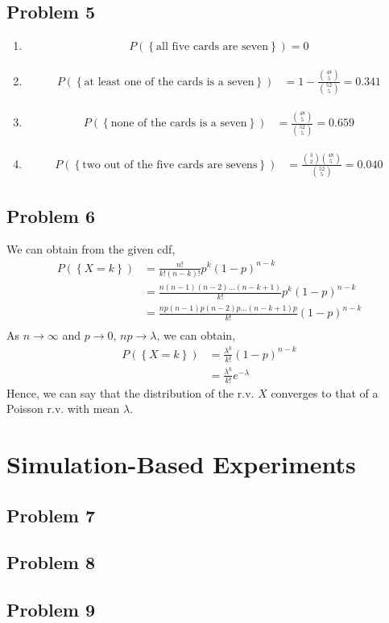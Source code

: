 \documentclass{article}
\begin{document}
	\subsection*{Problem 5}
		\begin{enumerate}
			\item
				\begin{align*}
					P\left(\left\{ \text{all five cards are seven} \right\}\right) = 0
				\end{align*}
			\item
				\begin{align*}
					P\left(\left\{ \text{at least one of the cards is a seven} \right\}\right) &= 1 - \frac{\binom{48}{5}}{\binom{52}{5}} = 0.341
				\end{align*}
			\item
				\begin{align*}
					P\left(\left\{ \text{none of the cards is a seven} \right\}\right) &= \frac{\binom{48}{5}}{\binom{52}{5}} = 0.659
				\end{align*}
			\item
				\begin{align*}
					P\left(\left\{ \text{two out of the five cards are sevens} \right\}\right) &= \frac{\binom{3}{2}\binom{48}{5}}{\binom{52}{5}} = 0.040
				\end{align*}
		\end{enumerate}

	\subsection*{Problem 6}
		We can obtain from the given cdf,
		\begin{align*}
			P(\left\{ X = k \right\}) &= \frac{n!}{k!(n-k)!} p^k (1-p)^{n-k} \\
			&= \frac{n(n-1)(n-2) \ldots (n-k+1)}{k!} p^k (1-p)^{n-k} \\
			&= \frac{np(n-1)p(n-2)p \ldots (n-k+1)p}{k!} (1-p)^{n-k} \\
		\end{align*}
		As $n \rightarrow \infty$ and $p \rightarrow 0$, $np \rightarrow \lambda$,
		we can obtain,
		\begin{align*}
			P(\left\{ X = k \right\}) &= \frac{\lambda^k}{k!} (1-p)^{n-k} \\
			&= \frac{\lambda^k}{k!} e^{-\lambda}
		\end{align*}
		Hence, we can say that the distribution of the r.v. $X$ converges to that of
		a Poisson r.v. with mean $\lambda$.

\section*{Simulation-Based Experiments}
	\subsection*{Problem 7}
	\subsection*{Problem 8}
	\subsection*{Problem 9}
\end{document}
